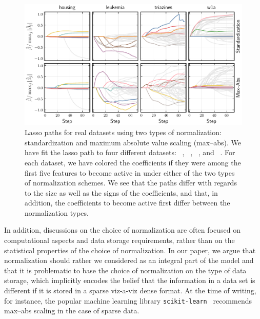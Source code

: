\begin{figure}[bpt]
  \centering
  \includegraphics[]{plots/realdata_paths.pdf}
  \caption{%
    Lasso paths for real datasets using two types of normalization: standardization and maximum absolute value scaling (max--abs). We have fit the lasso path to four different datasets: ~\citep{harrison1978}, ~\citep{golub1999}, ~\citep{king}, and ~\citep{platt1998}. For each dataset, we have colored the coefficients if they were among the first five features to become active in under either of the two types of normalization schemes. We see that the paths differ with regards to the size as well as the signs of the coefficients, and that, in addition, the coefficients to become active first differ between the normalization types.
  }
  \label{fig:realdata-paths}
\end{figure}

In addition, discussions on the choice of normalization are often focused on computational
aspects and data storage requirements, rather than on the statistical properties of the
choice of normalization. In our paper, we argue that normalization should rather we
considered as an integral part of the model and that it is problematic to base the choice
of normalization on the type of data storage, which implicitly encodes the belief that the
information in a data set is different if it is stored in a sparse viz-a-viz dense format.
At the time of writing, for instance, the popular machine learning library
\texttt{scikit-learn}~\citep{scikit-learndevelopers2024} recommends max--abs scaling in the
case of sparse data.
